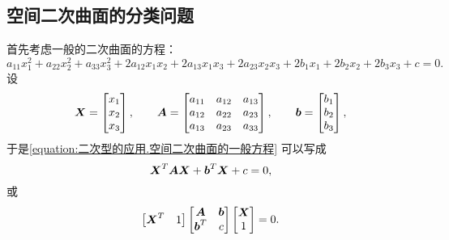 \subsection{空间二次曲面的分类问题}
首先考虑一般的二次曲面的方程：\begin{equation}\label{equation:二次型的应用.空间二次曲面的一般方程}
	a_{11} x_1^2
	+ a_{22} x_2^2
	+ a_{33} x_3^2
	+ 2 a_{12} x_1 x_2
	+ 2 a_{13} x_1 x_3
	+ 2 a_{23} x_2 x_3
	+ 2 b_1 x_1
	+ 2 b_2 x_2
	+ 2 b_3 x_3
	+ c
	= 0.
\end{equation}
设\begin{equation*}
	\boldsymbol{X} = \begin{bmatrix}
		x_1 \\ x_2 \\ x_3
	\end{bmatrix},
	\qquad
	\boldsymbol{A} = \begin{bmatrix}
		a_{11} & a_{12} & a_{13} \\
		a_{12} & a_{22} & a_{23} \\
		a_{13} & a_{23} & a_{33}
	\end{bmatrix},
	\qquad
	\boldsymbol{b} = \begin{bmatrix}
		b_1 \\ b_2 \\ b_3
	\end{bmatrix},
\end{equation*}
于是\cref{equation:二次型的应用.空间二次曲面的一般方程} 可以写成\begin{equation*}
	\boldsymbol{X}^T \boldsymbol{A} \boldsymbol{X}
	+ \boldsymbol{b}^T \boldsymbol{X}
	+ c
	= 0,
\end{equation*}
或\begin{equation}\label{equation:二次型的应用.空间二次曲面的一般方程.矩阵形式}
	\begin{bmatrix}
		\boldsymbol{X}^T & 1
	\end{bmatrix}
	\begin{bmatrix}
		\boldsymbol{A} & \boldsymbol{b} \\
		\boldsymbol{b}^T & c
	\end{bmatrix}
	\begin{bmatrix}
		\boldsymbol{X} \\ 1
	\end{bmatrix}
	= 0.
\end{equation}

